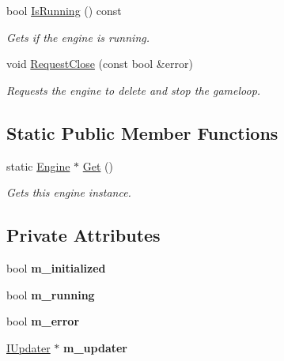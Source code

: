 \begin{DoxyCompactItemize}
bool \hyperlink{class_flounder_1_1_engine_a076fc8a5189c7ce72cf0eca02f6827d4}{Is\+Running} () const
\begin{DoxyCompactList}\small\item\em Gets if the engine is running. \end{DoxyCompactList}\item 
void \hyperlink{class_flounder_1_1_engine_abe7ee6fc6606fbc3aedc522585ee4930}{Request\+Close} (const bool \&error)
\begin{DoxyCompactList}\small\item\em Requests the engine to delete and stop the gameloop. \end{DoxyCompactList}\end{DoxyCompactItemize}
\subsection*{Static Public Member Functions}
\begin{DoxyCompactItemize}
\item 
static \hyperlink{class_flounder_1_1_engine}{Engine} $\ast$ \hyperlink{class_flounder_1_1_engine_a544bad93d45c4c55411716a125065c7b}{Get} ()
\begin{DoxyCompactList}\small\item\em Gets this engine instance. \end{DoxyCompactList}\end{DoxyCompactItemize}
\subsection*{Private Attributes}
\begin{DoxyCompactItemize}
\item 
\mbox{\label{class_flounder_1_1_engine_a67f44be0294a6b58a1ab77f160b39038}} 
bool {\bfseries m\+\_\+initialized}
\item 
\mbox{\label{class_flounder_1_1_engine_af6294efc066bd7060e12b5d4c9d14bc1}} 
bool {\bfseries m\+\_\+running}
\item 
\mbox{\label{class_flounder_1_1_engine_a033c6b5a9e4f85ef366deeeb74c7e1ac}} 
bool {\bfseries m\+\_\+error}
\item 
\mbox{\label{class_flounder_1_1_engine_a3b9ce2fae3d610ed18592e59322b8bc0}} 
\hyperlink{class_flounder_1_1_i_updater}{I\+Updater} $\ast$ {\bfseries m\+\_\+updater}
\end{DoxyCompactItemize}
